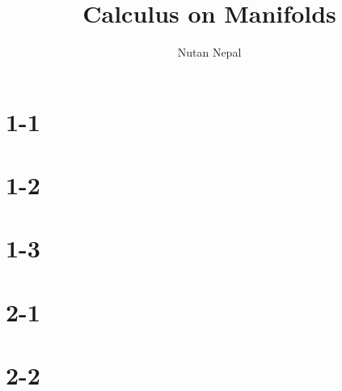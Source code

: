 
\title{Calculus on Manifolds}
\author{Nutan Nepal}



\maketitle
    \section{1-1}
    \section{1-2}
        
    \section{1-3}
        
        
        \begin{questions}
            
            
            
            
            
        \end{questions}
    \section{2-1}
        \begin{questions}
            
            
            
            
        \end{questions}
    \section{2-2}
        
